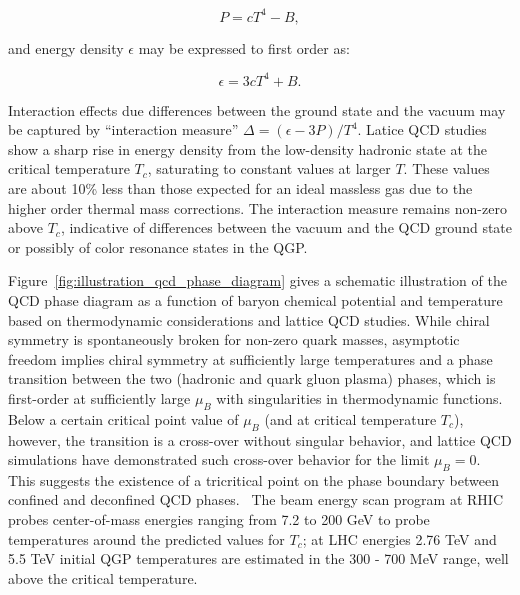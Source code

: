 \begin{equation}
\label{eq:pressure}
P = cT^4 - B,
\end{equation} 

\noindent and energy density $\epsilon$ may be expressed to first order as: 

\begin{equation}
\label{eq:epsilon}
\epsilon = 3cT^4 + B.
\end{equation} 

\noindent Interaction effects due differences between the ground state and the vacuum may be captured by ``interaction measure'' $\Delta = (\epsilon - 3P)/T^{4}$.  Latice QCD studies show a sharp rise in energy density from the low-density hadronic state at the critical temperature $T_{c}$, saturating to constant values at larger $T$.  These values are about 10\% less than those expected for an ideal massless gas due to the higher order thermal mass corrections.  The interaction measure remains non-zero above $T_{c}$, indicative of differences between the vacuum and the QCD ground state or possibly of color resonance states in the QGP.~\cite{Sarkar:2010zza, Satz:2012zza}

Figure~\ref{fig:illustration_qcd_phase_diagram} gives a schematic illustration of the QCD phase diagram as a function of baryon chemical potential and temperature based on thermodynamic considerations and lattice QCD studies.  While chiral symmetry is spontaneously broken for non-zero quark masses, asymptotic freedom implies chiral symmetry at sufficiently large temperatures and a phase transition between the two (hadronic and quark gluon plasma) phases, which is first-order at sufficiently large $\mu_{B}$ with singularities in thermodynamic functions.  Below a certain critical point value of $\mu_{B}$ (and at critical temperature $T_{c}$), however, the transition is a cross-over without singular behavior, and lattice QCD simulations have demonstrated such cross-over behavior for the limit $\mu_{B} = 0$.  This suggests the existence of a tricritical point on the phase boundary between confined and deconfined QCD phases.~\cite{Sarkar:2010zza, Satz:2012zza, Stephanov:2007fk}  The beam energy scan program at RHIC probes center-of-mass energies ranging from 7.2 to 200 GeV to probe temperatures around the predicted values for $T_{c}$;  at LHC energies 2.76 TeV and 5.5 TeV initial QGP temperatures are estimated in the 300 - 700 MeV range, well above the critical temperature.~\cite{Foka2016} 

